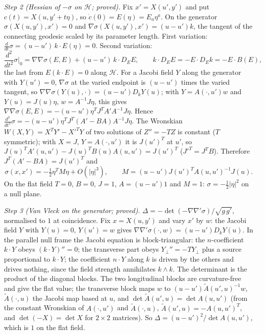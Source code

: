 \emph{Step 2 (Hessian of $-\sigma$ on $\mathcal{H}$; proved).} Fix $x' = X(u', y')$ and put $c(t) = X(u, y' + t\eta)$, so $\dot c(0) = E(\eta) = E_{a}\eta^{a}$. On the generator $\sigma(X(u, y'), x') = 0$ and $\nabla\sigma(X(u, y'), x') = (u - u')k$, the tangent of the connecting geodesic scaled by its parameter length. First variation: $\tfrac{d}{dt}\sigma = (u - u')\,k\cdot E(\eta) = 0$. Second variation:
\[
\frac{d^{2}}{dt^{2}}\sigma\Big|_{0} = \nabla\nabla\sigma(E, E) + (u - u')\,k\cdot D_{E}E,
\qquad k\cdot D_{E}E = -E\cdot D_{E}k = -E\cdot B(E),
\]
the last from $E(k\cdot E) = 0$ along $\mathcal{H}$. For a Jacobi field $Y$ along the generator with $Y(u') = 0$, $\nabla\sigma$ at the varied endpoint is $(u - u')$ times the varied tangent, so $\nabla\nabla\sigma(Y(u), \cdot) = (u - u')D_{k}Y(u)$; with $Y = A(\cdot, u')w$ and $Y(u) = J(u)\eta$, $w = A^{-1}J\eta$, this gives $\nabla\nabla\sigma(E, E) = -(u - u')\eta^{T}J^{T}A'A^{-1}J\eta$. Hence $\tfrac{d^{2}}{dt^{2}}\sigma = -(u - u')\eta^{T}J^{T}(A' - BA)A^{-1}J\eta$. The Wronskian $W(X, Y) = X^{T}Y' - X'^{T}Y$ of two solutions of $Z'' = -TZ$ is constant ($T$ symmetric); with $X = J$, $Y = A(\cdot, u')$ it is $J(u')^{T}$ at $u'$, so $J(u)^{T}A'(u, u') - J(u)^{T}B(u)A(u, u') = J(u')^{T}$ ($J'^{T} = J^{T}B$). Therefore $J^{T}(A' - BA) = J(u')^{T}$ and
\[
\sigma(x, x') = -\tfrac12\eta^{T}M\eta + O(|\eta|^{3}),\qquad M = (u - u')J(u')^{T}A(u, u')^{-1}J(u).
\]
On the flat field $T = 0$, $B = 0$, $J = 1$, $A = (u - u')1$ and $M = 1$: $\sigma = -\tfrac12|\eta|^{2}$ on a null plane.

\emph{Step 3 (Van Vleck on the generator; proved).} $\Delta = -\det(-\nabla\nabla'\sigma)/\sqrt{g\,g'}$, normalised to $1$ at coincidence. Fix $x = X(u, y')$ and vary $x'$ by $w$: the Jacobi field $Y$ with $Y(u) = 0$, $Y(u') = w$ gives $\nabla\nabla'\sigma(\cdot, w) = (u - u')D_{k}Y(u)$. In the parallel null frame the Jacobi equation is block-triangular: the $n$-coefficient $k\cdot Y$ obeys $(k\cdot Y)'' = 0$; the transverse part obeys $Y_{\perp}'' = -TY_{\perp}$ plus a source proportional to $k\cdot Y$; the coefficient $n\cdot Y$ along $k$ is driven by the others and drives nothing, since the field strength annihilates $k\wedge k$. The determinant is the product of the diagonal blocks. The two longitudinal blocks are curvature-free and give the flat value; the transverse block maps $w$ to $(u - u')\tilde A(u', u)^{-1}w$, $\tilde A(\cdot, u)$ the Jacobi map based at $u$, and $\det\tilde A(u', u) = \det A(u, u')$ (from the constant Wronskian of $A(\cdot, u')$ and $\tilde A(\cdot, u)$, $\tilde A(u', u) = -A(u, u')^{T}$, and $\det(-X) = \det X$ for $2\times 2$ matrices). So $\Delta = (u - u')^{2}/\det A(u, u')$, which is $1$ on the flat field.

